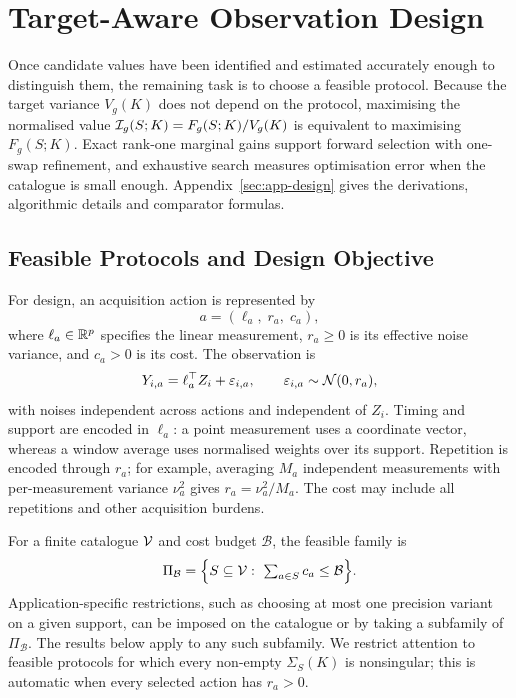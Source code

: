 \section{Target-Aware Observation Design}
\label{sec:design}

Once candidate values have been identified and estimated accurately enough to
distinguish them, the remaining task is to choose a feasible protocol. Because
the target variance $V_g(K)$ does not depend on the protocol, maximising the
normalised value $\mathcal{I}_g(S;K)=F_g(S;K)/V_g(K)$ is equivalent to maximising
$F_g(S;K)$.
Exact rank-one marginal gains support forward selection with one-swap
refinement, and exhaustive search measures optimisation error when the
catalogue is small enough. Appendix~\ref{sec:app-design} gives the derivations,
algorithmic details and comparator formulas.

\subsection{Feasible Protocols and Design Objective}

For design, an acquisition action is represented by
\begin{equation}
a=(\ell_a,\;r_a,\;c_a),
\label{eq:action}
\end{equation}
where $\ell_a\in\mathbb{R}^p$ specifies the linear measurement, $r_a\ge0$ is its
effective noise variance, and $c_a>0$ is its cost. The observation is
\begin{equation}
Y_{i,a}=\ell_a^\top Z_i+\varepsilon_{i,a},
\qquad \varepsilon_{i,a}\sim\mathcal{N}(0,r_a),
\label{eq:observation}
\end{equation}
with noises independent across actions and independent of $Z_i$. Timing and
support are encoded in $\ell_a$: a point measurement uses a coordinate vector,
whereas a window average uses normalised weights over its support. Repetition
is encoded through $r_a$; for example, averaging $M_a$ independent measurements
with per-measurement variance $\nu_a^2$ gives $r_a=\nu_a^2/M_a$. The cost may
include all repetitions and other acquisition burdens.

For a finite catalogue $\mathcal{V}$ and cost budget $\mathcal B$, the feasible family
is
\begin{equation}
\Pi_{\mathcal B}=\Big\{S\subseteq\mathcal{V}:\
\textstyle\sum_{a\in S}c_a\le\mathcal B\Big\}.
\label{eq:feasible-family}
\end{equation}
Application-specific restrictions, such as choosing at most one precision
variant on a given support, can be imposed on the catalogue or by taking a
subfamily of $\Pi_{\mathcal B}$. The results below apply to any such subfamily.
We restrict attention to feasible protocols for which every non-empty
$\Sigma_S(K)$ is nonsingular; this is automatic when every selected action has
$r_a>0$.

